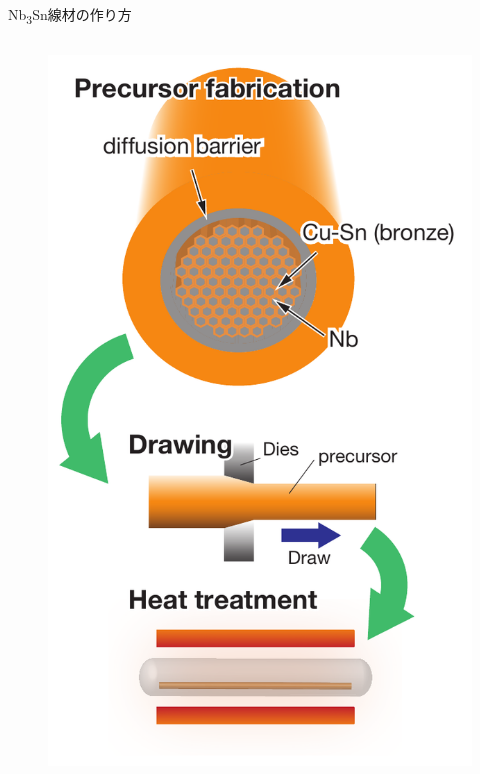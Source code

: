 \documentclass[aspectratio=169, unicode, 10pt]{beamer}
\begin{document}
\begin{frame}{Nb\textsubscript{3}Sn線材の作り方}
\begin{columns}
\begin{column}{0.35\linewidth}
\begin{figure}
					\includegraphics[width=0.9\linewidth]{figs/brozeProcessFabricationProcedure.pdf}
				\end{figure}	
			\end{column}
		\end{columns}
	\end{frame}
\end{document}
